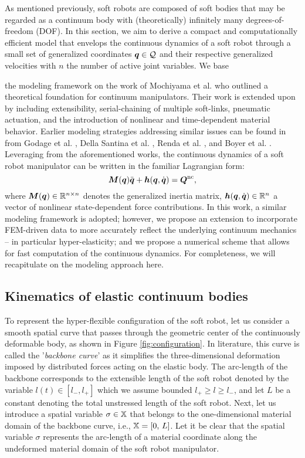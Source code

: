 As mentioned previously, soft robots are composed of soft bodies that may be regarded as a continuum body with (theoretically) infinitely many degrees-of-freedom (DOF). In this section, we aim to derive a compact and computationally efficient model that envelops the continuous dynamics of a soft robot through a small set of generalized coordinates ${\boldsymbol{q}}\in\mathcal{Q}$ and their respective generalized velocities  with $n$ the number of active joint variables. We base {the modeling framework on the work of Mochiyama et al.\cite{Mochiyama2003} who outlined a theoretical foundation for continuum manipulators. Their work is extended upon by including extensibility, serial-chaining of multiple soft-links, pneumatic actuation, and the introduction of nonlinear and time-dependent material behavior. Earlier modeling strategies addressing similar issues can be found in from Godage et al. \cite{Godage2015,Godage2016}, Della Santina et al. \cite{Santina2020,Santina2020b,Santina2020Pcc}, Renda et al. \cite{Renda2018}, and Boyer et al. \cite{Boyer2021}. Leveraging from the aforementioned works, the continuous dynamics of a soft robot manipulator can be written in the familiar Lagrangian form:
%
\begin{equation}
\boldsymbol{M}({\boldsymbol{q}}) {\ddot{\boldsymbol{q}}} + \boldsymbol{h}({\boldsymbol{q}},{\dot{\boldsymbol{q}}}) = \boldsymbol{Q}^{\text{nc}},
\end{equation}
%
where $\boldsymbol{M}({\boldsymbol{q}})  \in \mathbb{R}^{n\times n}$ denotes the generalized inertia matrix, $\boldsymbol{h}({\boldsymbol{q}},{\dot{\boldsymbol{q}}}) \in \mathbb{R}^n$ a vector of nonlinear state-dependent force contributions. In this work, a similar modeling framework is adopted; however, we propose an extension to incorporate FEM-driven data to more accurately reflect the underlying continuum mechanics -- in particular hyper-elasticity; and we propose a numerical scheme that allows for fast computation of the continuous dynamics. For completeness, we will recapitulate on the modeling approach here.

\subsection{Kinematics of elastic continuum bodies}
\noindent To represent the hyper-flexible configuration of the soft robot, let us consider a smooth spatial curve that passes through the geometric center of the continuously deformable body, as shown in Figure \ref{fig:configuration}. {In literature, this curve is called} the '\textit{backbone curve}' as it simplifies the three-dimensional deformation imposed by distributed forces acting on the elastic body. The arc-length of the backbone corresponds to the extensible length of the soft robot denoted by the variable $l(t) \in [l_{-},l_{+}]$ which we assume bounded $l_{+} \ge l \ge l_{-}$, and let $L$ be a constant denoting the {total unstressed} length of the soft robot. Next, let us introduce a spatial variable
$\sigma \in \mathbb{X}$ that belongs to the one-dimensional material domain of the backbone curve, i.e., $\mathbb{X} = [0,\, L]$. {Let it be clear that the spatial variable $\sigma$ represents the arc-length of a material coordinate along the undeformed material domain of the soft robot manipulator.}

}
